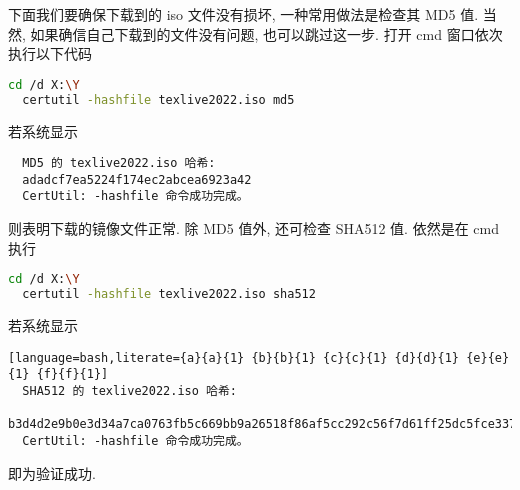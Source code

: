 下面我们要确保下载到的 iso 文件没有损坏, 一种常用做法是检查其 MD5 值.
当然, 如果确信自己下载到的文件没有问题, 也可以跳过这一步.
打开 \textsf{cmd} 窗口依次执行以下代码
\begin{lstlisting}[language = bash]
  cd /d X:\Y
  certutil -hashfile texlive2022.iso md5
\end{lstlisting}
若系统显示
\begin{lstlisting}
  MD5 的 texlive2022.iso 哈希:
  adadcf7ea5224f174ec2abcea6923a42
  CertUtil: -hashfile 命令成功完成。
\end{lstlisting}
则表明下载的镜像文件正常.
除 MD5 值外,
还可检查 SHA512 值.
依然是在 \textsf{cmd} 执行
\begin{lstlisting}[language = bash]
  cd /d X:\Y
  certutil -hashfile texlive2022.iso sha512
\end{lstlisting}
若系统显示
\begin{lstlisting}[language=bash,literate={a}{a}{1} {b}{b}{1} {c}{c}{1} {d}{d}{1} {e}{e}{1} {f}{f}{1}]
  SHA512 的 texlive2022.iso 哈希:
  b3d4d2e9b0e3d34a7ca0763fb5c669bb9a26518f86af5cc292c56f7d61ff25dc5fce3373f814d970d99b0d40df393ad594336cf1b35a95a9655289666d964d59
  CertUtil: -hashfile 命令成功完成。
\end{lstlisting}
即为验证成功.

